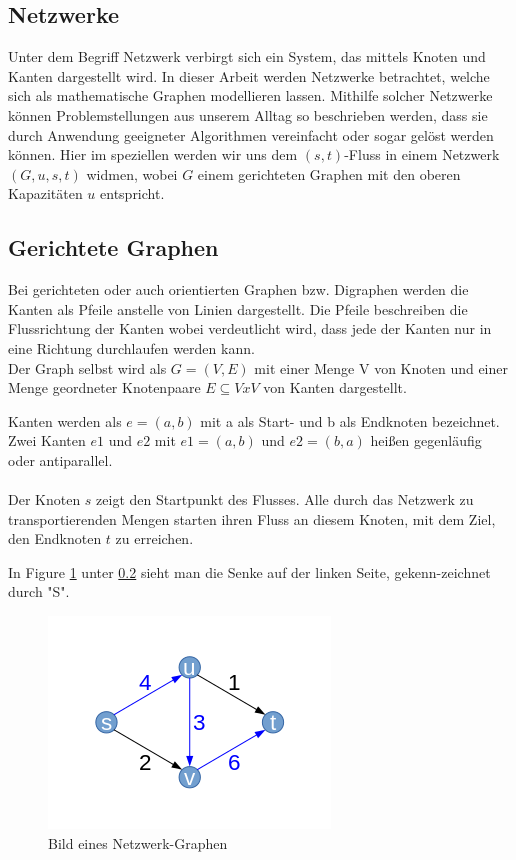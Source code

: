\documentclass[a4paper]{llncs}
\begin{document}
\subsection{Netzwerke}
\label{Netzwerke}
Unter dem Begriff Netzwerk verbirgt sich ein System, das mittels Knoten und Kanten dargestellt wird.  In dieser Arbeit werden Netzwerke betrachtet, welche sich als mathematische Graphen modellieren lassen. Mithilfe solcher Netzwerke können Problemstellungen aus unserem Alltag so beschrieben werden, dass sie durch Anwendung geeigneter Algorithmen vereinfacht oder sogar gelöst werden können. Hier im speziellen werden wir uns dem $(s,t)$-Fluss in einem Netzwerk $(G,u,s,t)$ widmen, wobei  $G$ einem gerichteten Graphen mit den oberen Kapazitäten $u$ entspricht.


\subsection{Gerichtete Graphen}
\label{Graph}
Bei gerichteten oder auch orientierten Graphen bzw. Digraphen werden die Kanten als Pfeile anstelle von Linien dargestellt. Die Pfeile beschreiben die Flussrichtung der Kanten wobei verdeutlicht wird, dass jede der Kanten nur in eine Richtung durchlaufen werden kann.\\

Der Graph selbst wird als
$G = (V,E)$ mit einer Menge V von Knoten und einer Menge
geordneter Knotenpaare $E \subseteq V x V$ von Kanten dargestellt.\\

\newpage

Kanten werden als 
$e = (a,b)$
mit a als Start- und b als Endknoten bezeichnet.
Zwei Kanten $e1$ und $e2$ mit 
$e1 = (a,b)$ und $e2 = (b,a)$
heißen gegenläufig oder antiparallel.\\ \\
Der Knoten $s$ zeigt den Startpunkt des Flusses. Alle durch das Netzwerk zu transportierenden Mengen starten ihren Fluss an diesem Knoten, mit dem Ziel, den Endknoten $t$ zu erreichen.

In Figure \ref{fig:Graph1} unter \ref{Graph} sieht man die Senke auf der linken Seite, gekenn-zeichnet durch "S". 

\begin{figure}[htbp] 
  \centering
     \includegraphics{graph1} 
  \caption{Bild eines Netzwerk-Graphen}
  \label{fig:Graph1}
\end{figure}
\end{document}
